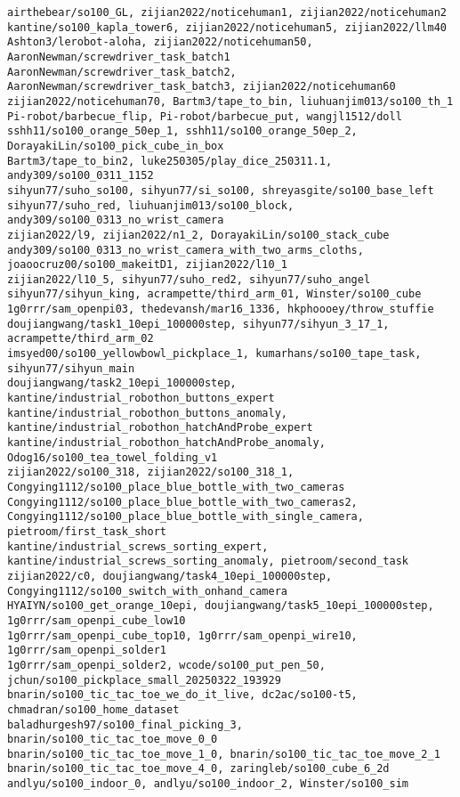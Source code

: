\begin{verbatim}
airthebear/so100_GL, zijian2022/noticehuman1, zijian2022/noticehuman2
kantine/so100_kapla_tower6, zijian2022/noticehuman5, zijian2022/llm40
Ashton3/lerobot-aloha, zijian2022/noticehuman50, AaronNewman/screwdriver_task_batch1
AaronNewman/screwdriver_task_batch2, AaronNewman/screwdriver_task_batch3, zijian2022/noticehuman60
zijian2022/noticehuman70, Bartm3/tape_to_bin, liuhuanjim013/so100_th_1
Pi-robot/barbecue_flip, Pi-robot/barbecue_put, wangjl1512/doll
sshh11/so100_orange_50ep_1, sshh11/so100_orange_50ep_2, DorayakiLin/so100_pick_cube_in_box
Bartm3/tape_to_bin2, luke250305/play_dice_250311.1, andy309/so100_0311_1152
sihyun77/suho_so100, sihyun77/si_so100, shreyasgite/so100_base_left
sihyun77/suho_red, liuhuanjim013/so100_block, andy309/so100_0313_no_wrist_camera
zijian2022/l9, zijian2022/n1_2, DorayakiLin/so100_stack_cube
andy309/so100_0313_no_wrist_camera_with_two_arms_cloths, joaoocruz00/so100_makeitD1, zijian2022/l10_1
zijian2022/l10_5, sihyun77/suho_red2, sihyun77/suho_angel
sihyun77/sihyun_king, acrampette/third_arm_01, Winster/so100_cube
1g0rrr/sam_openpi03, thedevansh/mar16_1336, hkphoooey/throw_stuffie
doujiangwang/task1_10epi_100000step, sihyun77/sihyun_3_17_1, acrampette/third_arm_02
imsyed00/so100_yellowbowl_pickplace_1, kumarhans/so100_tape_task, sihyun77/sihyun_main
doujiangwang/task2_10epi_100000step, kantine/industrial_robothon_buttons_expert
kantine/industrial_robothon_buttons_anomaly, kantine/industrial_robothon_hatchAndProbe_expert
kantine/industrial_robothon_hatchAndProbe_anomaly, Odog16/so100_tea_towel_folding_v1
zijian2022/so100_318, zijian2022/so100_318_1, 
Congying1112/so100_place_blue_bottle_with_two_cameras
Congying1112/so100_place_blue_bottle_with_two_cameras2, 
Congying1112/so100_place_blue_bottle_with_single_camera, pietroom/first_task_short
kantine/industrial_screws_sorting_expert, kantine/industrial_screws_sorting_anomaly, pietroom/second_task
zijian2022/c0, doujiangwang/task4_10epi_100000step, Congying1112/so100_switch_with_onhand_camera
HYAIYN/so100_get_orange_10epi, doujiangwang/task5_10epi_100000step, 1g0rrr/sam_openpi_cube_low10
1g0rrr/sam_openpi_cube_top10, 1g0rrr/sam_openpi_wire10, 1g0rrr/sam_openpi_solder1
1g0rrr/sam_openpi_solder2, wcode/so100_put_pen_50, jchun/so100_pickplace_small_20250322_193929
bnarin/so100_tic_tac_toe_we_do_it_live, dc2ac/so100-t5, chmadran/so100_home_dataset
baladhurgesh97/so100_final_picking_3, bnarin/so100_tic_tac_toe_move_0_0
bnarin/so100_tic_tac_toe_move_1_0, bnarin/so100_tic_tac_toe_move_2_1
bnarin/so100_tic_tac_toe_move_4_0, zaringleb/so100_cube_6_2d
andlyu/so100_indoor_0, andlyu/so100_indoor_2, Winster/so100_sim

\end{verbatim}
